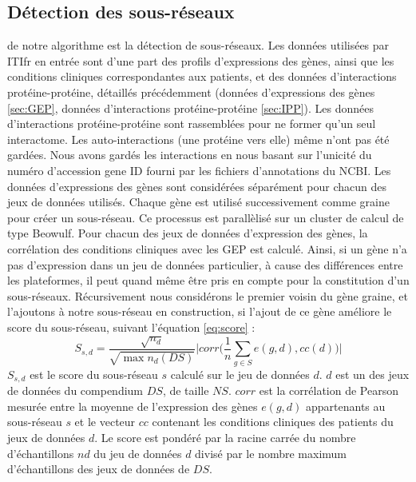 		\subsection{\textcolor{green!45!black}{Détection des sous-réseaux}}
			 de notre algorithme est la détection de sous-réseaux.
			Les données utilisées par \acs{ITIfr} en entrée sont d'une part des profils d'expressions des gènes, ainsi que les conditions cliniques correspondantes aux patients, et des données d'interactions protéine-protéine, détaillés précédemment (données d'expressions des gènes \ref{sec:GEP}, données d'interactions protéine-protéine \ref{sec:IPP}).
			Les données d'interactions protéine-protéine sont rassemblées pour ne former qu'un seul interactome.
			Les auto-interactions (une protéine vers elle) même n'ont pas été gardées.
			Nous avons gardés les interactions en nous basant sur l'unicité du numéro d'accession gene ID fourni par les fichiers d'annotations du NCBI. 
			Les données d'expressions des gènes sont considérées séparément pour chacun des jeux de données utilisés.
			Chaque gène est utilisé successivement comme graine pour créer un sous-réseau.
			Ce processus est parallèlisé sur un cluster de calcul de type Beowulf.
			Pour chacun des jeux de données d'expression des gènes, la corrélation des conditions cliniques avec les \acs{GEP} est calculé.
			Ainsi, si un gène n'a pas d'expression dans un jeu de données particulier, à cause des différences entre les plateformes, il peut quand même être pris en compte pour la constitution d'un sous-réseaux.
			Récursivement nous considérons le premier voisin du gène graine, et l'ajoutons à notre sous-réseau en construction, si l'ajout de ce gène améliore le score du sous-réseau, suivant l'équation \ref{eq:score} :
				\begin{equation}\label{eq:score}
					S_{s,d}=\frac{\sqrt{n_{d}}}{\sqrt{\max n_{d}(DS)}}\Bigg|corr\Bigg(\frac{1}{n}\sum_{g\in S}e(g,d),cc(d)\Bigg)\Bigg|
				\end{equation}
			$S_{s,d}$ est le score du sous-réseau $s$ calculé sur le jeu de données $d$.
			$d$ est un des jeux de données du compendium $DS$, de taille $NS$.
			$corr$ est la corrélation de Pearson mesurée entre la moyenne de l'expression des gènes $e(g,d)$ appartenants au sous-réseau $s$ et le vecteur $cc$ contenant les conditions cliniques des patients du jeux de données $d$.
			Le score est pondéré par la racine carrée du nombre d'échantillons $nd$ du jeu de données $d$ divisé par le nombre maximum d'échantillons des jeux de données de $DS$.
	
